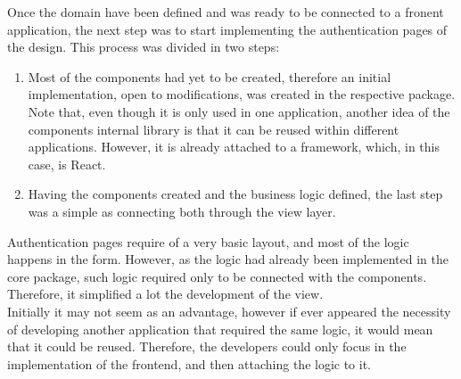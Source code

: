 \documentclass[../memory.tex]{subfiles}
\begin{document}
Once the domain have been defined and was ready to be connected to a fronent
application, the next step was to start implementing the authentication pages of
the design. This process was divided in two steps:
\begin{enumerate}[label = \arabic{*}.]
	\item Most of the components had yet to be created, therefore an initial
	      implementation, open to modifications, was created in the respective
	      package. Note that, even though it is only used in one application, another
	      idea of the components internal library is that it can be reused within
	      different applications. However, it is already attached to a framework,
	      which, in this case, is React.
	\item Having the components created and the business logic defined, the last
	      step was a simple as connecting both through the view layer.
\end{enumerate}
Authentication pages require of a very basic layout, and most of the logic
happens in the form. However, as the logic had already been implemented in the
core package, such logic required only to be connected with the components.
Therefore, it simplified a lot the development of the view.
\\
Initially it may not seem as an advantage, however if ever appeared the
necessity of developing another application that required the same logic, it
would mean that it could be reused. Therefore, the developers could only focus
in the implementation of the frontend, and then attaching the logic to it.
\end{document}
